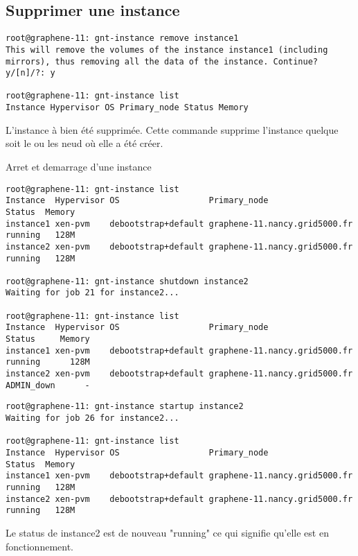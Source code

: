 \subsection {Supprimer une instance}
\begin{lstlisting}
root@graphene-11: gnt-instance remove instance1
This will remove the volumes of the instance instance1 (including
mirrors), thus removing all the data of the instance. Continue?
y/[n]/?: y

root@graphene-11: gnt-instance list
Instance Hypervisor OS Primary_node Status Memory
\end{lstlisting}
L'instance à bien été supprimée. Cette commande supprime l'instance quelque soit le ou les neud où elle a été créer.


Arret et demarrage d'une instance
\begin{lstlisting}
root@graphene-11: gnt-instance list
Instance  Hypervisor OS                  Primary_node                  Status  Memory
instance1 xen-pvm    debootstrap+default graphene-11.nancy.grid5000.fr running   128M
instance2 xen-pvm    debootstrap+default graphene-11.nancy.grid5000.fr running   128M

root@graphene-11: gnt-instance shutdown instance2
Waiting for job 21 for instance2...

root@graphene-11: gnt-instance list
Instance  Hypervisor OS                  Primary_node                  Status     Memory
instance1 xen-pvm    debootstrap+default graphene-11.nancy.grid5000.fr running      128M
instance2 xen-pvm    debootstrap+default graphene-11.nancy.grid5000.fr ADMIN_down      -
\end{lstlisting}


\begin{lstlisting}
root@graphene-11: gnt-instance startup instance2
Waiting for job 26 for instance2...

root@graphene-11: gnt-instance list
Instance  Hypervisor OS                  Primary_node                  Status  Memory
instance1 xen-pvm    debootstrap+default graphene-11.nancy.grid5000.fr running   128M
instance2 xen-pvm    debootstrap+default graphene-11.nancy.grid5000.fr running   128M
\end{lstlisting}
Le status de instance2 est de nouveau "running" ce qui signifie qu'elle est en fonctionnement.

